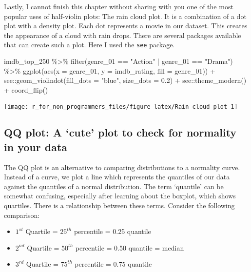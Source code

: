 \documentclass[
]{book}
\newenvironment{Shaded}{\begin{snugshade}}{\end{snugshade}}
\newcommand{\AttributeTok}[1]{\textcolor[rgb]{0.77,0.63,0.00}{#1}}
\newcommand{\FloatTok}[1]{\textcolor[rgb]{0.00,0.00,0.81}{#1}}
\newcommand{\FunctionTok}[1]{\textcolor[rgb]{0.00,0.00,0.00}{#1}}
\newcommand{\NormalTok}[1]{#1}
\newcommand{\SpecialCharTok}[1]{\textcolor[rgb]{0.00,0.00,0.00}{#1}}
\newcommand{\StringTok}[1]{\textcolor[rgb]{0.31,0.60,0.02}{#1}}
\begin{document}
Lastly, I cannot finish this chapter without sharing with you one of the most popular uses of half-violin plots: The rain cloud plot. It is a combination of a dot plot with a density plot. Each dot represents a movie in our dataset. This creates the appearance of a cloud with rain drops. There are several packages available that can create such a plot. Here I used the \texttt{see} package.

\begin{Shaded}
\begin{Highlighting}[]
\NormalTok{imdb\_top\_250 }\SpecialCharTok{\%\textgreater{}\%}
  \FunctionTok{filter}\NormalTok{(genre\_01 }\SpecialCharTok{==} \StringTok{"Action"} \SpecialCharTok{|}\NormalTok{ genre\_01 }\SpecialCharTok{==} \StringTok{"Drama"}\NormalTok{) }\SpecialCharTok{\%\textgreater{}\%} 
  \FunctionTok{ggplot}\NormalTok{(}\FunctionTok{aes}\NormalTok{(}\AttributeTok{x =}\NormalTok{ genre\_01, }\AttributeTok{y =}\NormalTok{ imdb\_rating, }\AttributeTok{fill =}\NormalTok{ genre\_01)) }\SpecialCharTok{+} 
\NormalTok{  see}\SpecialCharTok{::}\FunctionTok{geom\_violindot}\NormalTok{(}\AttributeTok{fill\_dots =} \StringTok{"blue"}\NormalTok{, }\AttributeTok{size\_dots =} \FloatTok{0.2}\NormalTok{) }\SpecialCharTok{+}
\NormalTok{  see}\SpecialCharTok{::}\FunctionTok{theme\_modern}\NormalTok{() }\SpecialCharTok{+}
  \FunctionTok{coord\_flip}\NormalTok{()}
\end{Highlighting}
\end{Shaded}

\begin{center}\texttt{[image: r\_for\_non\_programmers\_files/figure-latex/Rain cloud plot-1]} \end{center}

\hypertarget{qq-plot}{%
\subsection{QQ plot: A `cute' plot to check for normality in your data}\label{qq-plot}}

The QQ plot is an alternative to comparing distributions to a normality curve. Instead of a curve, we plot a line which represents the quantiles of our data against the quantiles of a normal distribution. The term `quantile' can be somewhat confusing, especially after learning about the boxplot, which shows quartiles. There is a relationship between these terms. Consider the following comparison:

\begin{itemize}
\item
  \(1^{st}\) Quartile = \(25^{th}\) percentile = 0.25 quantile
\item
  \(2^{nd}\) Quartile = \(50^{th}\) percentile = 0.50 quantile = median
\item
  \(3^{rd}\) Quartile = \(75^{th}\) percentile = 0.75 quantile
\end{itemize}
\end{document}
